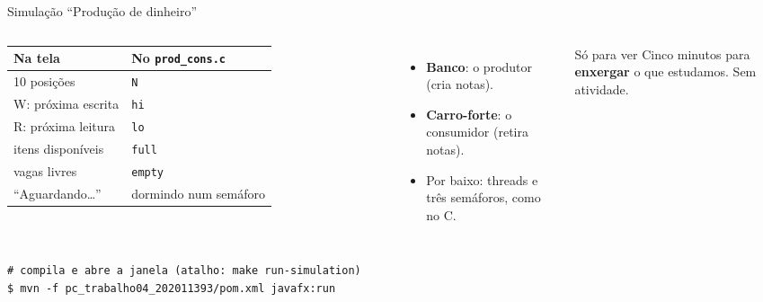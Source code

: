 \documentclass[aspectratio=169]{beamer}
\begin{document}
\begin{frame}[fragile]{Simulação ``Produção de dinheiro''}
\begin{columns}[T]
\small
\begin{tabular}{@{}ll@{}}
\toprule
\textbf{Na tela} & \textbf{No \texttt{prod\_cons.c}} \\
\midrule
10 posições & \texttt{N} \\
W: próxima escrita & \texttt{hi} \\
R: próxima leitura & \texttt{lo} \\
itens disponíveis & \texttt{full} \\
vagas livres & \texttt{empty} \\
``Aguardando\ldots'' & dormindo num semáforo \\
\bottomrule
\end{tabular}

\small
\begin{itemize}
    \item \textbf{Banco}: o produtor (cria notas).
    \item \textbf{Carro-forte}: o consumidor (retira notas).
    \item Por baixo: threads e três semáforos, como no C.
\end{itemize}

\begin{exampleblock}{Só para ver}
Cinco minutos para \textbf{enxergar} o que estudamos. Sem atividade.
\end{exampleblock}
\end{columns}

\begin{lstlisting}[style=terminal, basicstyle=\ttfamily\scriptsize\color{termfg}]
# compila e abre a janela (atalho: make run-simulation)
$ mvn -f pc_trabalho04_202011393/pom.xml javafx:run
\end{lstlisting}
\end{frame}
\end{document}
